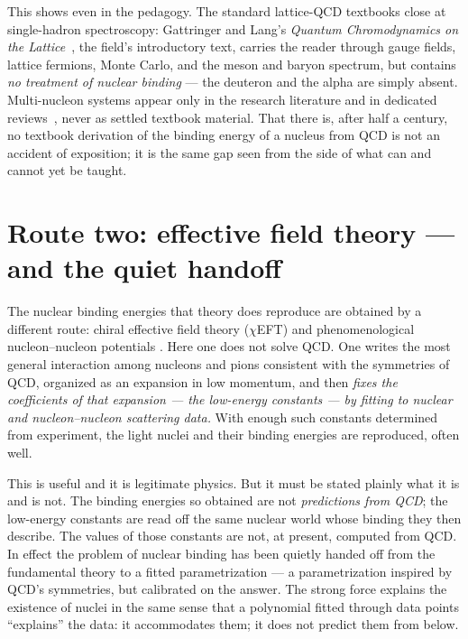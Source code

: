 \documentclass[11pt]{article}
\begin{document}
This shows even in the pedagogy. The standard lattice-QCD textbooks close at single-hadron
spectroscopy: Gattringer and Lang's \emph{Quantum Chromodynamics on the Lattice}~\cite{gattringer2010},
the field's introductory text, carries the reader through gauge fields, lattice fermions, Monte Carlo,
and the meson and baryon spectrum, but contains \emph{no treatment of nuclear binding} --- the deuteron
and the alpha are simply absent. Multi-nucleon systems appear only in the research literature and in
dedicated reviews~\cite{beane2011}, never as settled textbook material. That there is, after half a
century, no textbook derivation of the binding energy of a nucleus from QCD is not an accident of
exposition; it is the same gap seen from the side of what can and cannot yet be taught.

\section{Route two: effective field theory --- and the quiet handoff}
\label{sec:eft}

The nuclear binding energies that theory does reproduce are obtained by a different route: chiral
effective field theory (\(\chi\)EFT) and phenomenological nucleon--nucleon potentials
\cite{weinberg1990,epelbaum2009}. Here one does not solve QCD. One writes the most general interaction
among nucleons and pions consistent with the symmetries of QCD, organized as an expansion in
low momentum, and then \emph{fixes the coefficients of that expansion --- the low-energy constants --- by
fitting to nuclear and nucleon--nucleon scattering data.} With enough such constants determined from
experiment, the light nuclei and their binding energies are reproduced, often well.

This is useful and it is legitimate physics. But it must be stated plainly what it is and is not. The
binding energies so obtained are not \emph{predictions from QCD}; the low-energy constants are read off
the same nuclear world whose binding they then describe. The values of those constants are not, at
present, computed from QCD. In effect the problem of nuclear binding has been quietly handed off from the
fundamental theory to a fitted parametrization --- a parametrization inspired by QCD's symmetries, but
calibrated on the answer. The strong force explains the existence of nuclei in the same sense that a
polynomial fitted through data points ``explains'' the data: it accommodates them; it does not predict
them from below.
\end{document}
